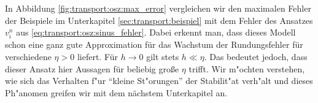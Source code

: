 In Abbildung \ref{fig:transport:osz:max_error} vergleichen wir den maximalen Fehler der Beispiele im Unterkapitel \ref{sec:transport:beispiel} mit dem Fehler des Ansatzes $v^n_i$ aus \eqref{eq:transport:osz:sinus_fehler}.
Dabei erkennt man, dass dieses Modell schon eine ganz gute Approximation für das Wachstum der Rundungsfehler für verschiedene $\eta > 0$ liefert.
Für $h \to 0$ gilt stets $h \ll \eta$.
Das bedeutet jedoch, dass dieser Ansatz hier Aussagen für beliebig große $\eta$ trifft.
Wir m"ochten verstehen, wie sich das Verhalten f"ur ``kleine St"orungen'' der Stabilit"at verh"alt und dieses Ph"anomen greifen wir mit dem nächstem Unterkapitel an.